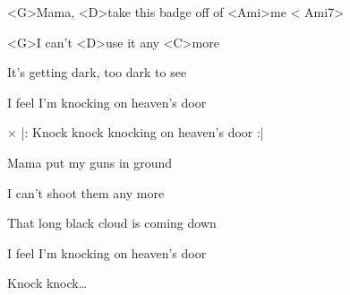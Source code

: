 

\zs
<G>Mama, <D>take this badge off of <Ami>me < Ami7>

<G>I can't <D>use it any <C>more

It's getting dark, too dark to see

I feel I'm knocking on heaven's door
\ks

× |: Knock knock knocking on heaven's door :|
\kr

\zs
Mama put my guns in ground

I can't shoot them any more

That long black cloud is coming down

I feel I'm knocking on heaven's door
\ks


\zr
Knock knock… \kr
\kp
